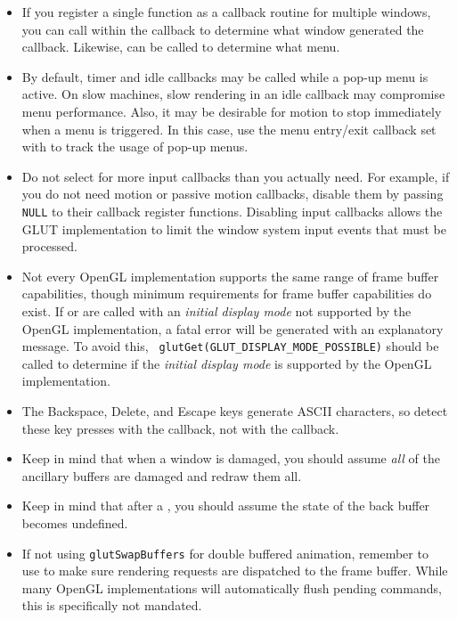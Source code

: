 \documentclass[titlepage,twoside]{article}
\begin{document}
\begin{itemize}
\item
If you register a single function as a callback routine for multiple
windows, you can call  within the callback to
determine what window generated the callback.  Likewise,  can be called to determine what menu.

\item
By default, timer and idle callbacks may be called while a
pop-up menu is active.  On slow machines, slow rendering in an idle
callback may compromise menu performance.  Also, it may be desirable
for motion to stop immediately when a menu is triggered.  In this
case, use the menu entry/exit callback set with 
to track the usage of pop-up menus.

\item
Do not select for more input callbacks than you actually
need.  For example, if you do not need motion or passive motion
callbacks, disable them by passing {\tt NULL} to their callback
register functions.  Disabling input callbacks allows the GLUT
implementation to limit the window system input events that must
be processed.

\item
Not every OpenGL implementation supports the same range of
frame buffer capabilities, though minimum requirements for
frame buffer capabilities do exist.  If 
or  are called with an {\em initial
display mode} not supported by the OpenGL implementation,
a fatal error will be generated with an explanatory message.
To avoid this, {\tt {} glutGet(GLUT\_DISPLAY\_MODE\_POSSIBLE)}
should be called to determine if the {\em initial
display mode} is supported by the OpenGL implementation.

\item
The Backspace, Delete, and Escape keys generate ASCII characters, so detect
these key presses with the  callback, not
with the  callback.

\item
Keep in mind that when a window is damaged, you should assume {\em all}
of the ancillary buffers are damaged and redraw them all.

\item
Keep in mind that after a , you should assume
the state of the back buffer becomes undefined.

\item
If not using {\tt glutSwapBuffers} for double buffered animation,
remember to use  to make sure rendering requests
are dispatched to the frame buffer.  While many OpenGL implementations
will automatically flush pending commands, this is specifically not
mandated.


\end{itemize}
\end{document}
